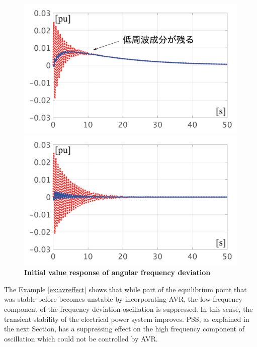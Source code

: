 \documentclass[tombow,dvipdfmx]{corona-a5-1.1}
\begin{document}
\begin{figure}[t]
  \centering
  {
  \begin{minipage}{0.49\linewidth}
    \centering
    \includegraphics[width = 1.0\linewidth]{figs/woAVRlarge}
  \end{minipage}
  \begin{minipage}{0.49\linewidth}
    \centering
    \includegraphics[width = 1.0\linewidth]{figs/wAVRlarge}
  \end{minipage}
  \medskip
  \caption{\textbf{Initial value response of angular frequency deviation}
  \\  
}
  \label{fig:avrlarged}
  }
\medskip
\end{figure}

The Example \ref{ex:avreffect} shows that while part of the equilibrium point that was stable before becomes unstable by incorporating AVR, the low frequency component of the frequency deviation oscillation is suppressed.
In this sense, the transient stability of the electrical power system improves.
PSS, as explained in the next Section, has a suppressing effect on the high frequency component of oscillation which could not be controlled by AVR.
\end{document}
